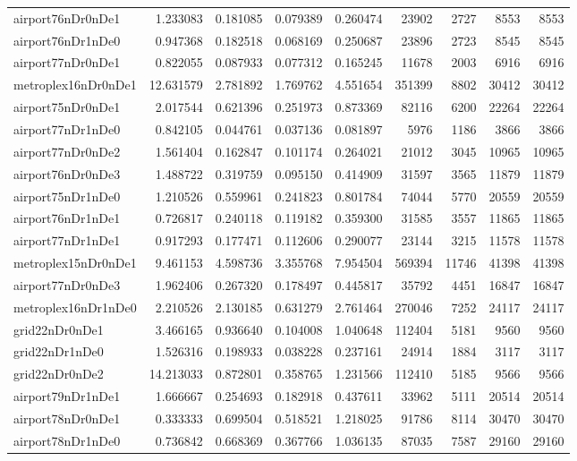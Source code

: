 \begin{longtable}{|l|r|r|r|r|r|r|r|r|}
airport76nDr0nDe1 & 1.233083 & 0.181085 & 0.079389 & 0.260474 & 23902 & 2727 & 8553 & 8553 \\
airport76nDr1nDe0 & 0.947368 & 0.182518 & 0.068169 & 0.250687 & 23896 & 2723 & 8545 & 8545 \\
airport77nDr0nDe1 & 0.822055 & 0.087933 & 0.077312 & 0.165245 & 11678 & 2003 & 6916 & 6916 \\
metroplex16nDr0nDe1 & 12.631579 & 2.781892 & 1.769762 & 4.551654 & 351399 & 8802 & 30412 & 30412 \\
airport75nDr0nDe1 & 2.017544 & 0.621396 & 0.251973 & 0.873369 & 82116 & 6200 & 22264 & 22264 \\
airport77nDr1nDe0 & 0.842105 & 0.044761 & 0.037136 & 0.081897 & 5976 & 1186 & 3866 & 3866 \\
airport77nDr0nDe2 & 1.561404 & 0.162847 & 0.101174 & 0.264021 & 21012 & 3045 & 10965 & 10965 \\
airport76nDr0nDe3 & 1.488722 & 0.319759 & 0.095150 & 0.414909 & 31597 & 3565 & 11879 & 11879 \\
airport75nDr1nDe0 & 1.210526 & 0.559961 & 0.241823 & 0.801784 & 74044 & 5770 & 20559 & 20559 \\
airport76nDr1nDe1 & 0.726817 & 0.240118 & 0.119182 & 0.359300 & 31585 & 3557 & 11865 & 11865 \\
airport77nDr1nDe1 & 0.917293 & 0.177471 & 0.112606 & 0.290077 & 23144 & 3215 & 11578 & 11578 \\
metroplex15nDr0nDe1 & 9.461153 & 4.598736 & 3.355768 & 7.954504 & 569394 & 11746 & 41398 & 41398 \\
airport77nDr0nDe3 & 1.962406 & 0.267320 & 0.178497 & 0.445817 & 35792 & 4451 & 16847 & 16847 \\
metroplex16nDr1nDe0 & 2.210526 & 2.130185 & 0.631279 & 2.761464 & 270046 & 7252 & 24117 & 24117 \\
grid22nDr0nDe1 & 3.466165 & 0.936640 & 0.104008 & 1.040648 & 112404 & 5181 & 9560 & 9560 \\
grid22nDr1nDe0 & 1.526316 & 0.198933 & 0.038228 & 0.237161 & 24914 & 1884 & 3117 & 3117 \\
grid22nDr0nDe2 & 14.213033 & 0.872801 & 0.358765 & 1.231566 & 112410 & 5185 & 9566 & 9566 \\
airport79nDr1nDe1 & 1.666667 & 0.254693 & 0.182918 & 0.437611 & 33962 & 5111 & 20514 & 20514 \\
airport78nDr0nDe1 & 0.333333 & 0.699504 & 0.518521 & 1.218025 & 91786 & 8114 & 30470 & 30470 \\
airport78nDr1nDe0 & 0.736842 & 0.668369 & 0.367766 & 1.036135 & 87035 & 7587 & 29160 & 29160 \\

\end{longtable}
